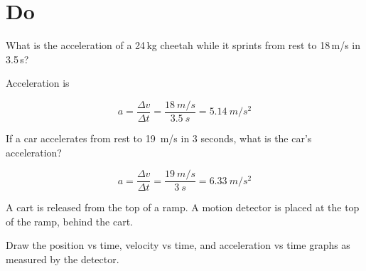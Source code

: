 \documentclass[answers]{exam}
\begin{document}
\section*{Do}

\begin{questions}
\question
What is the acceleration of a 24\,kg cheetah while it sprints from rest to 18\,m/s in 3.5\,s?

\begin{solutionorbox}[2cm]
Acceleration is

\begin{equation*}
    a = \frac{\Delta v}{\Delta t} = \frac{\SI{18}{m/s}}{\SI{3.5}{s}} = \boxed{\SI{5.14}{m/s^2}}
\end{equation*}
\end{solutionorbox}

\question
If a car accelerates from rest to \SI{19}{m/s} in 3 seconds, what is the car’s acceleration?

\begin{solutionorbox}[2cm]
\begin{equation*}
    a = \frac{\Delta v}{\Delta t} = \frac{\SI{19}{m/s}}{\SI{3}{s}} = \boxed{\SI{6.33}{m/s^2}}
\end{equation*}
\end{solutionorbox}

\question
A cart is released from the top of a ramp. A motion detector is placed at the top of the ramp, behind the cart.

\begin{center}
\end{center}

Draw the position vs time, velocity vs time, and acceleration vs time graphs as measured by the detector.


\end{questions}
\end{document}
